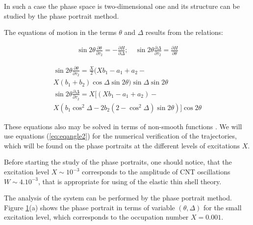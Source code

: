 In such a case the phase space is two-dimensional one and its structure can be studied by the phase portrait method.

The equations of motion in the terms $\theta$ and $\Delta$ results from the relations:

\begin{eqnarray}\label{eq:eqangle}
\sin{2 \theta} \frac{\partial \theta}{\partial \tau_{2}} = - \frac{\partial H}{\partial \Delta}; \quad \sin{2 \theta} \frac{\partial \Delta}{\partial \tau_{2}} = \frac{\partial H}{\partial \theta}
\end{eqnarray}

\begin{eqnarray}\label{eq:eqangle2}
\sin{2 \theta} \frac{\partial \theta}{\partial \tau_2}   = \frac{X}{2} \bigl( X b_{1}-a_{1}+a_{2} -  \nonumber \\ X \left( b_{1} + b_{2} \right) \cos{\Delta} \sin{2 \theta} \bigr) \sin{\Delta} \sin{2 \theta}  \nonumber  \\
\sin{2 \theta} \frac{\partial \Delta}{\partial \tau_2}   = X \bigl[ \left( X b_{1} - a_{1} +a_{2} \right) -  \\
X \left( b_{1} \cos^{2}{\Delta}-2 b_{2} \left( 2 - \cos^{2}{\Delta} \right) \sin{2 \theta} \right) \bigr] \cos{2 \theta} \nonumber
\end{eqnarray}

These equations also may be solved in terms of non-smooth functions \cite{PILIPCHUK199643}.%
We will use equations (\ref{eq:eqangle2}) for the numerical verification of the trajectories, which will be found on the phase portraits at the different levels of excitations $X$.

Before starting the study of the phase portraits, one should notice, that the excitation level $X \sim  10^{-3}$ corresponds to the amplitude of CNT oscillations $W \sim 4. 10^{-3}$, that is appropriate for using of the elastic thin shell theory.

The analysis of the system can be performed by the phase portrait method.
Figure \ref{fig:PP1}(a) shows the phase portrait in terms of variable $(\theta, \Delta)$ for the small excitation level, which corresponds to the occupation number $X=0.001$.

\begin{figure}
\label{fig:PP1}
\end{figure}

